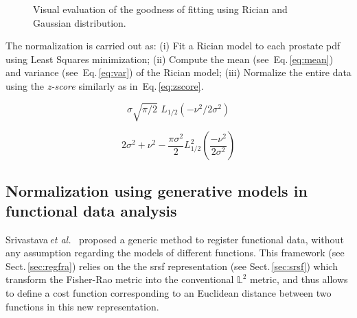 \begin{figure}
  \centering
  \hfill
  \hfill
  \caption{Visual evaluation of the goodness of fitting using Rician and Gaussian distribution.}
  \label{fig:fitting}
\end{figure}

The normalization is carried out as: 
(i) Fit a Rician model to each prostate \ac{pdf} using Least Squares minimization; 
(ii) Compute the mean (see~Eq.\,\eqref{eq:mean}) and variance (see~Eq.\,\eqref{eq:var}) of the Rician model;
(iii) Normalize the entire data using the \textit{z-score} similarly as in~Eq.\,\eqref{eq:zscore}.

\begin{equation}
  \sigma  \sqrt{\pi/2}\,\,L_{1/2}(-\nu^2/2\sigma^2) 
  \label{eq:mean}
\end{equation}

\begin{equation}
  2\sigma^2+\nu^2-\frac{\pi\sigma^2}{2}L_{1/2}^2\left(\frac{-\nu^2}{2\sigma^2}\right) 
  \label{eq:var}
\end{equation}

\subsection{Normalization using generative models in functional data analysis}

Srivastava\,\textit{et al.}~\cite{Srivastava2011} proposed a generic method to register functional data, without any assumption regarding the models of different functions. This framework (see Sect.\,\ref{sec:regfra}) relies on the the \ac{srsf} representation (see Sect.\,\ref{sec:srsf}) which transform the Fisher-Rao metric into the conventional $\mathbb{L}^2$ metric, and thus allows to define a cost function corresponding to an Euclidean distance between two functions in this new representation.

